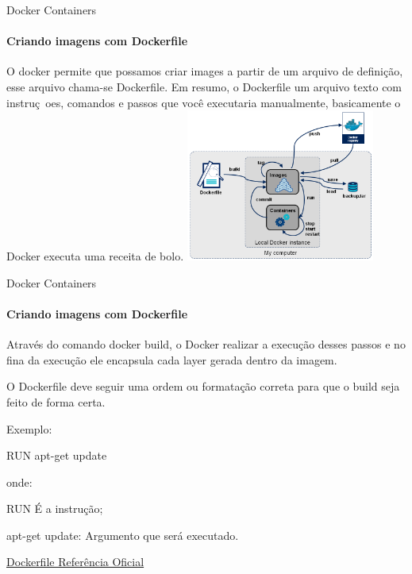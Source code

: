 \documentclass{beamer}
\begin{document}
\begin{frame}{Docker Containers}
    \framesubtitle{Criando imagens com Dockerfile}
    O docker permite que possamos criar images a partir de um arquivo de defini\c{c}\~ao, 
    esse arquivo chama-se Dockerfile. Em resumo, o Dockerfile  um arquivo texto com
    instru\c{c}~oes, comandos e passos que voc\^e executaria manualmente, basicamente
    o Docker executa uma receita de bolo.
    \includegraphics[height=5cm]{img/docker-stages.png}
\end{frame}

\begin{frame}{Docker Containers}
    \framesubtitle{Criando imagens com Dockerfile}
    Atrav\'es do comando docker build, o Docker realizar a execu\c{c}\~ao desses passos 
    e no fina da execu\c{c}\~ao ele encapsula cada layer gerada dentro da imagem.

    O Dockerfile deve seguir uma ordem ou formata\c{c}\~ao correta para que o build
    seja feito de forma certa.

    Exemplo:

    RUN apt-get update

    onde:

    RUN  \'E a instru\c{c}\~ao;

    apt-get update: Argumento que ser\'a executado.

    \href{https://docs.docker.com/engine/reference/builder/}{Dockerfile Referência Oficial}
\end{frame}
\end{document}
